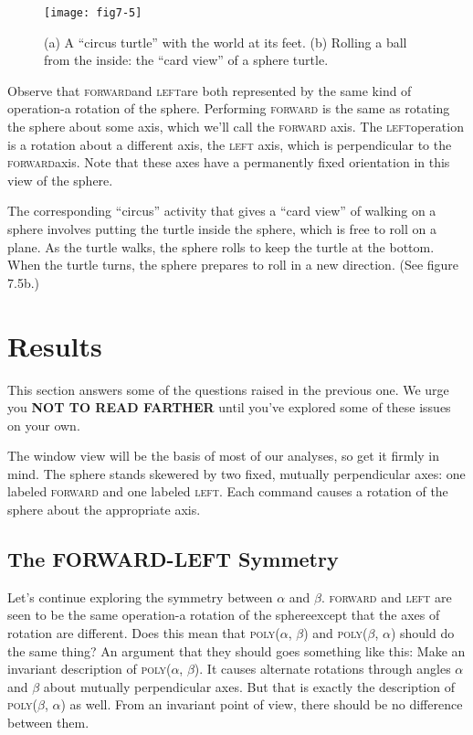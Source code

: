 \documentclass{book}
\begin{document}
\begin{figure}
\begin{center}
\texttt{[image: fig7-5]}
\caption{(a) A ``circus turtle'' with the world at its feet. (b) Rolling a ball from the inside: the ``card view'' of a sphere turtle.}
\end{center}
\end{figure}

Observe that \textsc{forward}and \textsc{left}are both represented by the same kind
of operation-a rotation of the sphere. Performing \textsc{forward} is the same
as rotating the sphere about some axis, which we'll call the \textsc{forward}
axis. The \textsc{left}operation is a rotation about a different axis, the \textsc{left}
axis, which is perpendicular to the \textsc{forward}axis. Note that these axes
have a permanently fixed orientation in this view of the sphere.

The corresponding ``circus'' activity that gives a ``card view'' of walking on a sphere involves putting the turtle inside the sphere, which is
free to roll on a plane. As the turtle walks, the sphere rolls to keep the
turtle at the bottom. When the turtle turns, the sphere prepares to roll
in a new direction. (See figure 7.5b.)

\section{Results}

This section answers some of the questions raised in the previous one.
We urge you \textbf{NOT TO READ FARTHER} until you've explored some of
these issues on your own.

The window view will be the basis of most of our analyses, so get
it firmly in mind. The sphere stands skewered by two fixed, mutually
perpendicular axes: one labeled \textsc{forward} and one labeled \textsc{left}. Each
command causes a rotation of the sphere about the appropriate axis.

\subsection{The FORWARD-LEFT Symmetry}

Let's continue exploring the symmetry between $\alpha$ and $\beta$. \textsc{forward} and
\textsc{left} are seen to be the same operation-a rotation of the sphereexcept that the axes of rotation are different. Does this mean that
\textsc{poly}($\alpha$, $\beta$) and \textsc{poly}($\beta$, $\alpha$) should do the same thing? An argument
that they should goes something like this: Make an invariant description
of \textsc{poly}($\alpha$, $\beta$). It causes alternate rotations through angles $\alpha$ and $\beta$
about mutually perpendicular axes. But that is exactly the description
of \textsc{poly}($\beta$, $\alpha$) as well. From an invariant point of view, there should be
no difference between them.
\end{document}
